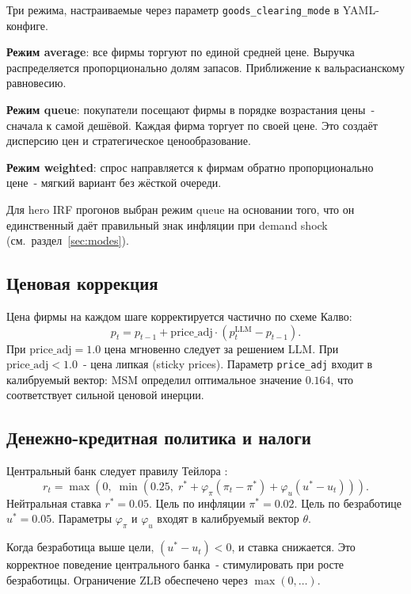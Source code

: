 \documentclass[12pt, a4paper]{article}
\begin{document}
Три режима, настраиваемые через параметр \texttt{goods\_clearing\_mode} в YAML-конфиге.

\textbf{Режим average}: все фирмы торгуют по единой средней цене. Выручка распределяется пропорционально долям запасов. Приближение к вальрасианскому равновесию.

\textbf{Режим queue}: покупатели посещают фирмы в порядке возрастания цены~- сначала к самой дешёвой. Каждая фирма торгует по своей цене. Это создаёт дисперсию цен и стратегическое ценообразование.

\textbf{Режим weighted}: спрос направляется к фирмам обратно пропорционально цене~- мягкий вариант без жёсткой очереди.

Для hero IRF прогонов выбран режим queue на основании того, что он единственный даёт правильный знак инфляции при demand shock (см.\ раздел~\ref{sec:modes}).

\subsection{Ценовая коррекция}

Цена фирмы на каждом шаге корректируется частично по схеме Калво:
\begin{equation}
p_t = p_{t-1} + \text{price\_adj} \cdot (p^{\text{LLM}}_t - p_{t-1}).
\end{equation}
При $\text{price\_adj} = 1.0$ цена мгновенно следует за решением LLM. При $\text{price\_adj} < 1.0$~- цена липкая (sticky prices). Параметр \texttt{price\_adj} входит в калибруемый вектор: MSM определил оптимальное значение $0.164$, что соответствует сильной ценовой инерции.

\subsection{Денежно-кредитная политика и налоги}

Центральный банк следует правилу Тейлора \cite{taylor1993}:
\begin{equation}
r_t = \max\!\left(0,\; \min\!\left(0.25,\; r^* + \varphi_{\pi}(\pi_t - \pi^*) + \varphi_u(u^* - u_t)\right)\right).
\end{equation}
Нейтральная ставка $r^* = 0.05$. Цель по инфляции $\pi^* = 0.02$. Цель по безработице $u^* = 0.05$. Параметры $\varphi_{\pi}$ и $\varphi_u$ входят в калибруемый вектор $\theta$.

Когда безработица выше цели, $(u^* - u_t) < 0$, и ставка снижается. Это корректное поведение центрального банка~- стимулировать при росте безработицы. Ограничение ZLB обеспечено через $\max(0, \ldots)$.
\end{document}
